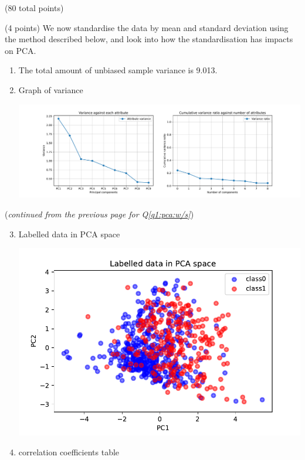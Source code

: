 \documentclass[12pt]{article}
\begin{document}
\begin{question}{(80 total points) \qOneTitle}
\begin{subquestion}{(4 points) %
    We now standardise the data by mean and standard deviation using the method described below, and look into how the standardisation has impacts on PCA.
  }
  \begin{answerbox}{0.5\textheight}
    \begin{enumerate}
    \item The total amount of unbiased sample variance is 9.013.
    \item Graph of variance
        \begin{center}
             \includegraphics[scale=0.47]{variance3.pdf}
        \end{center}
    \end{enumerate}
  \end{answerbox}
  \clearpage
  ({\it continued from the previous page for Q\ref{q1:pca:w/s}})
  \begin{answerbox}{0.6\textheight}
    \begin{enumerate}\setcounter{enumi}{2}
    \item Labelled data in PCA space
        \begin{center}
             \includegraphics[scale=1.0]{PCA2.pdf}
        \end{center}
    \item correlation coefficients table
    \begin{center}
        \begin{tabular}{c|c|c|c|c|c|c|c|c|c} \hline

\end{tabular}
\end{center}
\end{enumerate}
\end{answerbox}
\end{subquestion}
\end{question}
\end{document}
